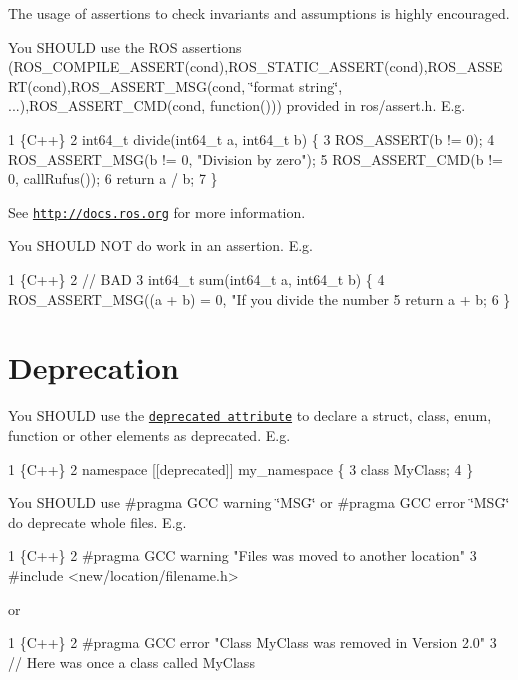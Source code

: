 The usage of assertions to check invariants and assumptions is highly encouraged.

You S\+H\+O\+U\+LD use the R\+OS assertions ({\ttfamily R\+O\+S\+\_\+\+C\+O\+M\+P\+I\+L\+E\+\_\+\+A\+S\+S\+E\+R\+T(cond)},{\ttfamily R\+O\+S\+\_\+\+S\+T\+A\+T\+I\+C\+\_\+\+A\+S\+S\+E\+R\+T(cond)},{\ttfamily R\+O\+S\+\_\+\+A\+S\+S\+E\+R\+T(cond)},{\ttfamily R\+O\+S\+\_\+\+A\+S\+S\+E\+R\+T\+\_\+\+M\+SG(cond, \char`\"{}format string\char`\"{}, ...)},{\ttfamily R\+O\+S\+\_\+\+A\+S\+S\+E\+R\+T\+\_\+\+C\+M\+D(cond, function())}) provided in {\ttfamily ros/assert.\+h}. E.\+g. 
\begin{DoxyCode}
1 \{C++\}
2 int64\_t divide(int64\_t a, int64\_t b) \{    
3     ROS\_ASSERT(b != 0);
4     ROS\_ASSERT\_MSG(b != 0, "Division by zero");
5     ROS\_ASSERT\_CMD(b != 0, callRufus());
6     return a / b;
7 \}
\end{DoxyCode}
 See \href{http://docs.ros.org/electric/api/rosconsole/html/assert_8h.html}{\tt http\+://docs.\+ros.\+org} for more information.

You S\+H\+O\+U\+LD N\+OT do work in an assertion. E.\+g. 
\begin{DoxyCode}
1 \{C++\}
2 // BAD
3 int64\_t sum(int64\_t a, int64\_t b) \{
4     ROS\_ASSERT\_MSG((a + b) = 0, "If you divide the number %
5     return a + b;
6 \}
\end{DoxyCode}
  \section*{Deprecation}

You S\+H\+O\+U\+LD use the \href{https://en.cppreference.com/w/cpp/language/attributes/deprecated}{\tt deprecated attribute} to declare a {\ttfamily struct}, {\ttfamily class}, {\ttfamily enum}, {\ttfamily function} or other elements as deprecated. E.\+g. 
\begin{DoxyCode}
1 \{C++\}
2 namespace [[deprecated]] my\_namespace \{
3     class MyClass;
4 \}
\end{DoxyCode}


You S\+H\+O\+U\+LD use {\ttfamily \#pragma G\+CC warning \char`\"{}\+M\+S\+G\char`\"{}} or {\ttfamily \#pragma G\+CC error \char`\"{}\+M\+S\+G\char`\"{}} do deprecate whole files. E.\+g. 
\begin{DoxyCode}
1 \{C++\}
2 #pragma GCC warning "Files was moved to another location"
3 #include <new/location/filename.h>
\end{DoxyCode}
 or 
\begin{DoxyCode}
1 \{C++\}
2 #pragma GCC error "Class MyClass was removed in Version 2.0"
3 // Here was once a class called MyClass
\end{DoxyCode}


